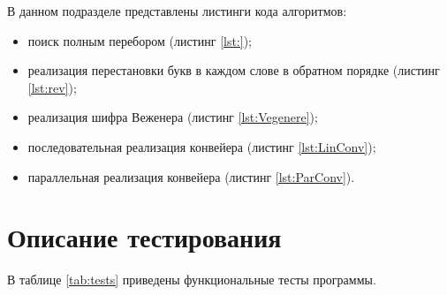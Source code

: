 В данном подразделе представлены листинги кода алгоритмов:
\begin{itemize}[]
    \item поиск полным перебором (листинг \ref{lst:});
    \item реализация перестановки букв в каждом слове в обратном
          порядке (листинг \ref{lst:rev});
    \item реализация шифра Веженера (листинг \ref{lst:Vegenere});
    \item последовательная реализация конвейера (листинг \ref{lst:LinConv});
    \item параллельная реализация конвейера (листинг \ref{lst:ParConv}).
\end{itemize}

%
%
%    
%
%    

\section{Описание тестирования}

В таблице \ref{tab:tests} приведены функциональные тесты программы.

